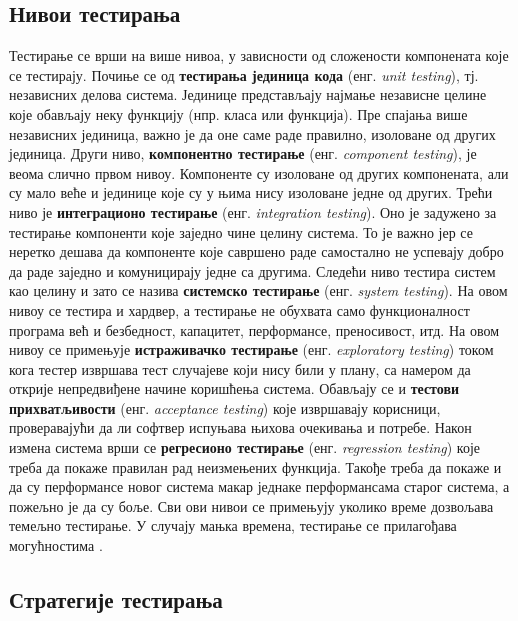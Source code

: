 \documentclass[12pt,oneside]{memoir}
\begin{document}
\subsection{Нивои тестирања}
\label{subsec:nivoiTest}

\par Тестирање се врши на више нивоа, у зависности од сложености компонената које се тестирају. Почиње се од \textbf{тестирања јединица кода} (енг. \textit{unit testing}), тј. независних делова система. Јединице представљају најмање независне целине које обављају неку функцију (нпр. класа или функција). Пре спајања више независних јединица, важно је да оне саме раде правилно, изоловане од других јединица. Други ниво, \textbf{компонентно тестирање} (енг. \textit{component testing}), је веома слично првом нивоу. Компоненте су изоловане од других компонената, али су мало веће и јединице које су у њима нису изоловане једне од других. Трећи ниво је \textbf{интеграционо тестирање} (енг. \textit{integration testing}). Оно је задужено за тестирање компоненти које заједно чине целину система. То је важно јер се неретко дешава да компоненте које савршено раде самостално не успевају добро да раде заједно и комуницирају једне са другима. Следећи ниво тестира систем као целину и зато се назива \textbf{системско тестирање} (енг. \textit{system testing}). На овом нивоу се тестира и хардвер, а тестирање не обухвата само функционалност програма већ и безбедност, капацитет, перформансе, преносивост, итд. На овом нивоу се примењује \textbf{истраживачко тестирање} (енг. \textit{exploratory testing}) током кога тестер извршава тест случајеве који нису били у плану, са намером да открије непредвиђене начине коришћења система. Обављају се и \textbf{тестови прихватљивости} (енг. \textit{acceptance testing}) које извршавају корисници, проверавајући да ли софтвер испуњава њихова очекивања и потребе. Након измена система врши се \textbf{регресионо тестирање} (енг. \textit{regression testing}) које треба да покаже правилан рад неизмењених  функција. Такође треба да покаже и да су перформансе новог система макар једнаке перформансама старог система, а пожељно је да су боље. Сви ови нивои се примењују уколико време дозвољава темељно тестирање. У случају мањка времена, тестирање се прилагођава могућностима \cite{guideTestDesign, testMilena}.

\subsection{Стратегије тестирања}
\label{subsec:stratTest}
\end{document}
